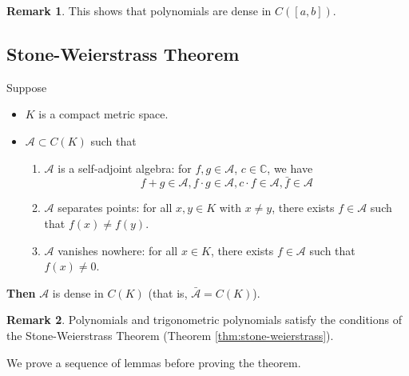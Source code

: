 \documentclass[11pt]{article}
\numberwithin{equation}{section}
\theoremstyle{definition}
\theoremstyle{definition}
\newtheorem*{remark}{Remark}
\def\ss{\subset}
\newcommand{\1}{\mathbbm 1}
\newcommand{\CC}{\mathbb C}
\newcommand{\aA}{\mathcal A}
\begin{document}
\begin{remark}
	This shows that polynomials are dense in $C([a,b])$. 
\end{remark}


\subsection{Stone-Weierstrass Theorem}

\begin{theorem}\label{thm:stone-weierstrass}
	Suppose 
	\begin{itemize}
		\item $K$ is a compact metric space.
		\item $\aA \ss C(K)$ such that
		\begin{enumerate}
			\item $\aA$ is a self-adjoint algebra: for $f,g \in \aA$, $c \in \CC$, we have
			\begin{equation}
				f+g \in \aA, f \cdot g \in \aA, c \cdot f \in \aA, \bar{f} \in \aA
			\end{equation}
			\item $\aA$ separates points: for all $x,y \in K$ with $x \neq y$, there exists $f \in \aA$ such that $f(x) \neq f(y)$. 
			\item $\aA$ vanishes nowhere: for all $x \in K$, there exists $f \in \aA$ such that $f(x) \neq 0$. 
		\end{enumerate}
	\end{itemize}
	\textbf{Then} $\aA$ is dense in $C(K)$ (that is, $\bar{\aA} = C(K)$). 
\end{theorem}

\begin{remark}
	Polynomials and trigonometric polynomials satisfy the conditions of the Stone-Weierstrass Theorem (Theorem \ref{thm:stone-weierstrass}).

\end{remark}

We prove a sequence of lemmas before proving the theorem. 
\end{document}
